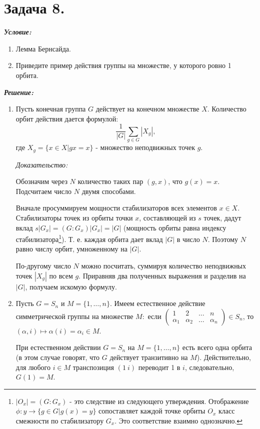\section*{Задача 8.}

\noindent\textbf{\textit{Условие:}}

\begin{enumerate}[label=\alph*)]
	\item Лемма Бернсайда.
	\item Приведите пример действия группы на множестве, у которого ровно 1 орбита.
\end{enumerate}

\noindent\textbf{\textit{Решение:}}

\begin{enumerate}[label=\alph*)]
	\item Пусть конечная группа $G$ действует на конечном множестве $X$. Количество орбит действия дается формулой:
	\[ \frac{1}{|G|} \sum_{g \in G} |X_g|, \]
	где $X_g = \{ x \in X | gx = x \}$ - множество неподвижных точек $g$.
	
	\textit{Доказательство:}
	
	Обозначим через $N$ количество таких пар $(g, x)$, что $g(x) = x$. Подсчитаем число $N$ двумя способами.
	
	Вначале просуммируем мощности стабилизаторов всех элементов $x \in X$.  Стабилизаторы точек из орбиты точки $x$, составляющей из $s$ точек, дадут вклад $s|G_x| = (G : G_x)|G_x| = |G|$ (мощность орбиты равна индексу стабилизатора\footnote{$|O_x| = (G : G_x)$ - это следствие из следующего утверждения. Отображение $\phi: y \to \{ g \in G | g(x) = y \}$ сопоставляет каждой точке орбиты $O_x$ класс смежности по стабилизатору $G_x$. Это соответствие взаимно однозначно.}). Т. е. каждая орбита дает вклад $|G|$ в число $N$. Поэтому $N$ равно числу орбит, умноженному на $|G|$.
	
	По-другому число $N$ можно посчитать, суммируя количество неподвижных точек $|X_g|$ по всем $g$. Приравняв два
	полученных выражения и разделив на $|G|$, получаем искомую формулу.
	
	\item Пусть $G = S_n$ и $M = \{1, \dots, n\}$. Имеем естественное действие симметрической группы на множестве $M:$ если $\left(\begin{smallmatrix} 1 & 2 & \dots & n \\ \alpha_1 & \alpha_2 & \dots & \alpha_n \end{smallmatrix}\right) \in S_n$, то $(\alpha, i) \mapsto \alpha(i) = \alpha_i \in M$.
	
	При естественном действии $G = S_n$ на $M = \{ 1, \dots, n \}$ есть всего одна орбита (в этом случае говорят, что $G$ действует транзитивно на $M$). Действительно, для любого $i \in M$ транспозиция $(1 ~ i)$ переводит 1 в $i$, следовательно, $G(1) = M$.
\end{enumerate}

 